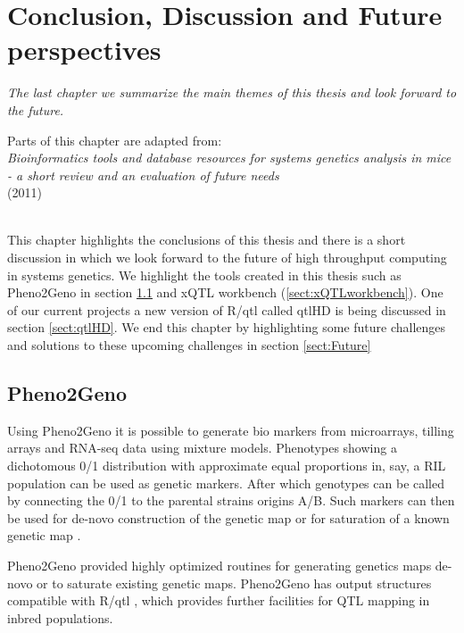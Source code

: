 \chapter{Conclusion, Discussion and Future perspectives}
\thispagestyle{empty}
\emph{The last chapter we summarize the main themes of this thesis and look forward to the future.}
\null
\vfill

\begin{myexampleblock}{Parts of this chapter are adapted from:}
  \\
  \emph{ Bioinformatics tools and database resources for systems genetics analysis in mice 
         - a short review and an evaluation of future needs}\\
   (2011)\\\\
\end{myexampleblock}

\newpage

This chapter highlights the conclusions of this thesis and there is a short discussion in 
which we look forward to the future of high throughput computing in systems genetics. We 
highlight the tools created in this thesis such as Pheno2Geno in section \ref{sect:Pheno2Geno} and xQTL 
workbench (\ref{sect:xQTLworkbench}). One of our current projects a new version of R/qtl called qtlHD 
is being discussed in section \ref{sect:qtlHD}. We end this chapter by highlighting some future challenges 
and solutions to these upcoming challenges in section \ref{sect:Future}

\section{Pheno2Geno}
\label{sect:Pheno2Geno}
Using Pheno2Geno it is possible to generate bio markers from microarrays, tilling arrays and 
RNA-seq data using mixture models. Phenotypes showing a dichotomous 0/1 distribution with 
approximate equal proportions in, say, a RIL population can be used as genetic markers. After 
which genotypes can be called by connecting the 0/1 to the parental strains origins A/B. Such 
markers can then be used for de-novo construction of the genetic map or for saturation of a 
known genetic map \cite{West:2006, Truco:2013}.

Pheno2Geno provided highly optimized routines for generating genetics maps de-novo or to 
saturate existing genetic maps. Pheno2Geno has output structures compatible with R/qtl 
\cite{Broman:2003, Arends:2010}, which provides further facilities for QTL mapping in 
inbred populations.

